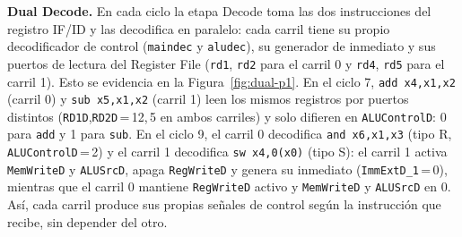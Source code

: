 \documentclass[12pt,a4paper]{article}
\begin{document}
\textbf{Dual Decode.} En cada ciclo la etapa Decode toma las dos instrucciones
del registro IF/ID y las decodifica en paralelo: cada carril tiene su propio
decodificador de control (\texttt{maindec} y \texttt{aludec}), su generador de
inmediato y sus puertos de lectura del Register File (\texttt{rd1}, \texttt{rd2}
para el carril 0 y \texttt{rd4}, \texttt{rd5} para el carril 1). Esto se
evidencia en la Figura~\ref{fig:dual-p1}. En el ciclo 7, \texttt{add x4,x1,x2}
(carril 0) y \texttt{sub x5,x1,x2} (carril 1) leen los mismos registros por
puertos distintos (\texttt{RD1D},\texttt{RD2D}\,=\,12,\,5 en ambos carriles) y
solo difieren en \texttt{ALUControlD}: 0 para \texttt{add} y 1 para \texttt{sub}.
En el ciclo 9, el carril 0 decodifica \texttt{and x6,x1,x3} (tipo R,
\texttt{ALUControlD}\,=\,2) y el carril 1 decodifica \texttt{sw x4,0(x0)}
(tipo S): el carril 1 activa \texttt{MemWriteD} y \texttt{ALUSrcD}, apaga
\texttt{RegWriteD} y genera su inmediato (\texttt{ImmExtD\_1}\,=\,0), mientras
que el carril 0 mantiene \texttt{RegWriteD} activo y \texttt{MemWriteD} y
\texttt{ALUSrcD} en 0. Así, cada carril produce sus propias señales de control
según la instrucción que recibe, sin depender del otro.
\end{document}
